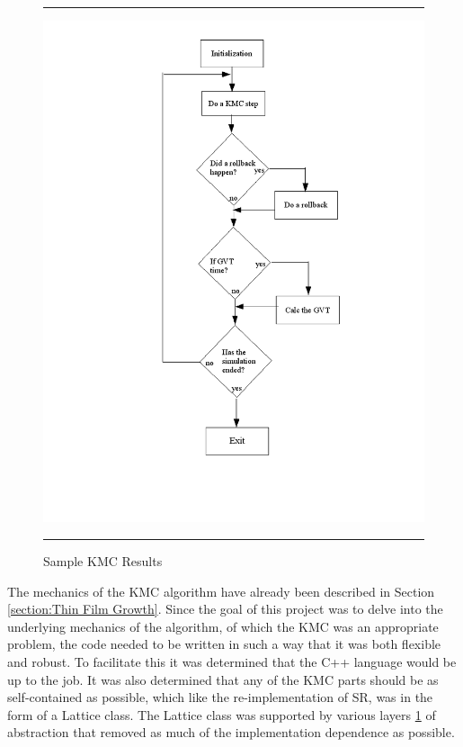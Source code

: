 \begin{figure}
\hrule
\vspace{0.5cm}
\includegraphics[scale=0.6]{timewarp_flowchart}
\hrule
\caption{Sample KMC Results}
\label{figure:Class Schema}
\end{figure}

The mechanics of the KMC algorithm have already been described in Section \ref{section:Thin Film Growth}.  Since the goal of this project was to delve into the underlying mechanics of the algorithm, of which the KMC was an appropriate problem, the code needed to be written in such a way that it was both flexible and robust.  To facilitate this it was determined that the C++ language would be up to the job.  It was also determined that any of the KMC parts should be as self-contained as possible, which like the re-implementation of SR, was in the form of a Lattice class.  The Lattice class was supported by various layers \ref{figure:Class Schema} of abstraction that removed as much of the implementation dependence as possible.

